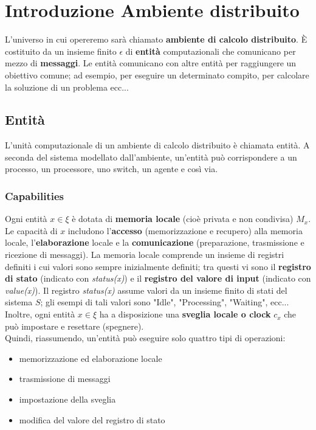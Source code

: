 \chapter{Introduzione Ambiente distribuito}

L'universo in cui opereremo sarà chiamato \textbf{ambiente di calcolo
    distribuito}. È costituito da un insieme finito $\epsilon$ di \textbf{entità}
computazionali che comunicano per mezzo di \textbf{messaggi}. Le entità
comunicano con altre entità per raggiungere un obiettivo comune; ad esempio,
per eseguire un determinato compito, per calcolare la soluzione di un problema
ecc...

\section{Entità}
L'unità computazionale di un ambiente di calcolo distribuito è chiamata entità.
A seconda del sistema modellato dall'ambiente, un'entità può corrispondere a un
processo, un processore, uno switch, un agente e così via.

\subsection{Capabilities}
Ogni entità $x \in \xi$ è dotata di \textbf{memoria locale} (cioè privata e non
condivisa) $M_x$. Le capacità di $x$ includono l'\textbf{accesso}
(memorizzazione e recupero) alla memoria locale, l'\textbf{elaborazione} locale
e la \textbf{comunicazione} (preparazione, trasmissione e ricezione di
messaggi). La memoria locale comprende un insieme di registri definiti i cui
valori sono sempre inizialmente definiti; tra questi vi sono il \textbf{registro
    di stato} (indicato con \textit{status(x)}) e il \textbf{registro del valore di
    input} (indicato con \textit{value(x)}). Il registro \textit{status(x)} assume
valori da un insieme finito di stati del sistema $S$; gli esempi di tali valori
sono "Idle", "Processing", "Waiting", ecc...\\
Inoltre, ogni entità $x \in \xi$ ha a disposizione una \textbf{sveglia locale o
    clock} $c_x$ che può impostare e resettare (spegnere).\\
Quindi, riassumendo, un'entità può eseguire solo quattro tipi di operazioni:

\begin{itemize}
    \item memorizzazione ed elaborazione locale
    \item trasmissione di messaggi
    \item impostazione della sveglia
    \item modifica del valore del registro di stato
\end{itemize}

